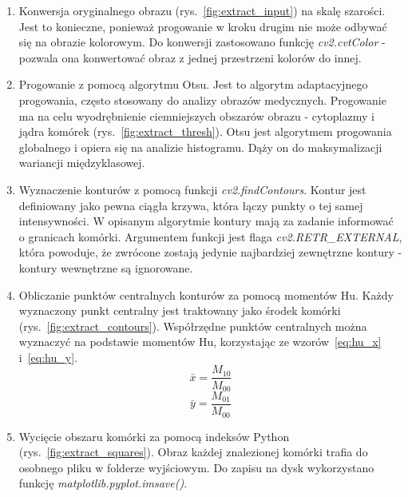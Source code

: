 \begin{enumerate}
    \item Konwersja oryginalnego obrazu (rys.~\ref{fig:extract_input}) na skalę szarości.
    Jest to konieczne, ponieważ progowanie w kroku drugim nie może odbywać się na obrazie kolorowym.
    Do konwersji zastosowano funkcję \textit{cv2.cvtColor} - pozwala ona konwertować obraz z jednej przestrzeni kolorów do innej.
    \item Progowanie z pomocą algorytmu Otsu.
    Jest to algorytm adaptacyjnego progowania, często stosowany do analizy obrazów medycznych.
    Progowanie ma na celu wyodrębnienie ciemniejszych obszarów obrazu - cytoplazmy i jądra komórek (rys.~\ref{fig:extract_thresh}). Otsu jest algorytmem progowania globalnego i opiera się na analizie histogramu.
    Dąży on do maksymalizacji wariancji międzyklasowej.
    \item Wyznaczenie konturów z pomocą funkcji \textit{cv2.findContours}.
    Kontur jest definiowany jako pewna ciągła krzywa, która łączy punkty o tej samej intensywności.
    W opisanym algorytmie kontury mają za zadanie informować o granicach komórki.
    Argumentem funkcji jest flaga \textit{cv2.RETR\_EXTERNAL}, która powoduje, że zwrócone zostają jedynie najbardziej zewnętrzne kontury - kontury wewnętrzne są ignorowane.
    \item Obliczanie punktów centralnych konturów za pomocą momentów Hu. Każdy wyznaczony punkt centralny jest traktowany jako środek komórki (rys.~\ref{fig:extract_contours}).
    Współrzędne punktów centralnych można wyznaczyć na podstawie momentów Hu, korzystając ze wzorów~\ref{eq:hu_x} i~\ref{eq:hu_y}.
    \begin{equation}
        \bar{x} = \dfrac{M_{10}}{M_{00}}\label{eq:hu_x}
    \end{equation}
    \begin{equation}
        \bar{y} = \dfrac{M_{01}}{M_{00}}\label{eq:hu_y}
    \end{equation}
    \item Wycięcie obszaru komórki za pomocą indeksów Python (rys.~\ref{fig:extract_squares}). Obraz każdej znalezionej komórki trafia do osobnego pliku w folderze wyjściowym.
    Do zapisu na dysk wykorzystano funkcję \textit{matplotlib.pyplot.imsave()}.
\end{enumerate}
